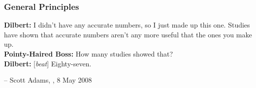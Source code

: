 \subsubsection{General Principles}
\begin{tcolorbox}[title=Data Validation]
\textbf{Dilbert:} I didn't have any accurate numbers, so I just made up this one. Studies have shown that accurate numbers aren't any more useful that the ones you make up. \\ 
\textbf{Pointy-Haired Boss:} How many studies showed that? \\ 
\textbf{Dilbert:} [\textit{beat}] Eighty-seven.\\[-0.6cm]
\begin{flushright}
-- Scott Adams, , 8 May 2008
\end{flushright}
\end{tcolorbox}
\noindent
